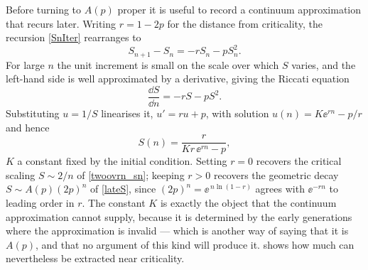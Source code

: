 Before turning to $A(p)$ proper it is useful to record a continuum approximation that
recurs later. Writing $r = 1-2p$ for the distance from criticality, the recursion
\cref{SnIter} rearranges to
\begin{equation}
\label{eq:Sdiff}
S_{n+1}-S_n = -r S_n - p S_n^2 .
\end{equation}
For large $n$ the unit increment is small on the scale over which $S$ varies, and the
left-hand side is well approximated by a derivative, giving the Riccati equation
\begin{equation}
\label{eq:riccati}
\frac{\dd S}{\dd n} = -r S - p S^2 .
\end{equation}
Substituting $u = 1/S$ linearises it, $u' = ru + p$, with solution
$u(n) = K\ee^{rn} - p/r$ and hence
\begin{equation}
\label{eq:riccatisol}
S(n) = \frac{r}{K r\,\ee^{rn} - p},
\end{equation}
$K$ a constant fixed by the initial condition. Setting $r=0$ recovers the critical
scaling $S\sim2/n$ of \cref{twoovrn_sn}; keeping $r>0$ recovers the geometric decay
$S\sim A(p)(2p)^n$ of \cref{lateS}, since $(2p)^n = \ee^{\,n\ln(1-r)}$ agrees with
$\ee^{-rn}$ to leading order in $r$. The constant $K$ is exactly the object that the
continuum approximation cannot supply, because it is determined by the early generations
where the approximation is invalid --- which is another way of saying that it is $A(p)$,
and that no argument of this kind will produce it.  shows how much
can nevertheless be extracted near criticality.

\FloatBarrier
